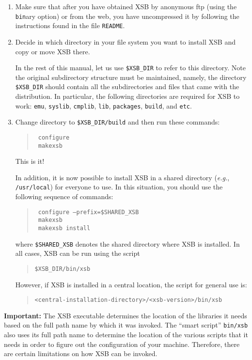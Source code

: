 \begin{enumerate}
\item   Make sure that after you have obtained XSB by anonymous ftp 
	(using the {\tt bin}ary option) or from the web, you have
	uncompressed it by following the instructions found in the
	file {\tt README}.

\item	Decide in which directory in your file system you want to
	install XSB and copy or move XSB there.

	In the rest of this manual, let us use \verb'$XSB_DIR' to
	refer to this directory.  Note the original subdirectory
	structure must be maintained, namely, the directory
	\verb'$XSB_DIR' should contain all the subdirectories and files
	that came with the distribution. In particular, the following
	directories are required for XSB to work:
	\verb'emu', \verb'syslib', \verb'cmplib', 
	\verb'lib', \verb'packages', \verb'build', and \verb'etc'.

\item Change directory to \verb'$XSB_DIR/build' and then run these commands:
  \begin{quote}
    \tt
    configure\\
    \tt
    makexsb
  \end{quote}
  This is it!
  
  In addition, it is now possible to install XSB in a shared directory
  ({\it e.g.}, {\tt /usr/local}) for everyone to use.  In this situation,
  you should use the following sequence of commands:
  \begin{quote}
    \tt
    configure --prefix=\verb'$SHARED_XSB'\\
    \tt
    makexsb\\
    \tt
    makexsb install
  \end{quote}
  where \verb'$SHARED_XSB' denotes the shared directory where XSB is
  installed.  In all cases, XSB can be run using the script
  \begin{quote}
    \verb'$XSB_DIR/bin/xsb'
  \end{quote}
  However, if XSB is installed in a central location, the script for
  general use is:
  \begin{quote}
    \verb'<central-installation-directory>/<xsb-version>/bin/xsb'
  \end{quote}
\end{enumerate}

{\bf Important:} The XSB executable determines the location of the
libraries it needs based on the full path name by which it was invoked.
The ``smart script'' \verb|bin/xsb| also uses its full path name to
determine the location of the various scripts that it needs in order to
figure out the configuration of your machine.  Therefore, there are certain
limitations on how XSB can be invoked.

